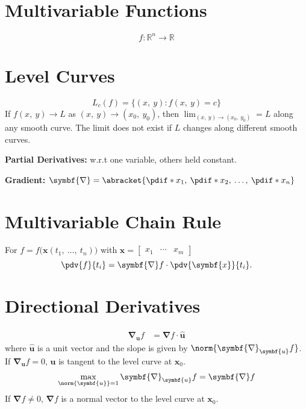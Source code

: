 \documentclass{article}
\begin{document}
\begin{multicols}{3}
    \section*{Multivariable Functions}
    \begin{equation*}
        f:\mathbb{R}^n\to\mathbb{R}
    \end{equation*}
    \section*{Level Curves}
    \begin{equation*}
        L_c\left( f \right) = \bigl\{ \left( x,\: y \right) : f\left(x,\: y\right) = c\bigr\}
    \end{equation*}
    If \(f\left( x,\: y \right) \to L\) as \(\left( x,\: y \right) \to \left( x_0,\: y_0 \right)\), then
    \(\displaystyle \lim_{\left( x,\: y \right) \to \left( x_0,\: y_0 \right)} = L\) along any smooth
    curve. The limit does not exist if \(L\) changes along different smooth curves.

    \textbf{Partial Derivatives:} w.r.t one variable, others held constant.

    \textbf{Gradient:} \(\symbf{\nabla} = \abracket{\pdif*{x_1},\: \pdif*{x_2},\: \dots,\: \pdif*{x_n}}\)
    \section*{Multivariable Chain Rule}
    For \(f=f\bigl(\symbf{x}\left( t_1,\: \ldots,\: t_n \right)\bigr)\) with
    \(\symbf{x}=
    \begin{bmatrix}
        x_1 & \cdots & x_m
    \end{bmatrix}
    \)
    \begin{equation*}
        \pdv{f}{t_i} = \symbf{\nabla}f \cdot \pdv{\symbf{x}}{t_i}.
    \end{equation*}
    \section*{Directional Derivatives}
    \begin{align*}
        \symbf{\nabla}_{\symbf{u}}f
         & = \symbf{\nabla}f \cdot \hat{\symbf{u}}
    \end{align*}
    where \(\hat{\symbf{u}}\) is a unit vector and the slope is given by \(\norm{\symbf{\nabla}_{\symbf{u}}f}\).
    If \(\symbf{\nabla}_{\symbf{u}}f=0\), \(\symbf{u}\) is tangent to the level curve at \(\symbf{x}_0\).
    \begin{align*}
        \max_{\norm{\symbf{u}} = 1} \symbf{\nabla}_{\symbf{u}}f = \symbf{\nabla}f
    \end{align*}
    If \(\symbf{\nabla}f\neq 0\), \(\symbf{\nabla}f\) is a normal vector to the level curve at \(\symbf{x}_0\).

\end{multicols}
\end{document}
